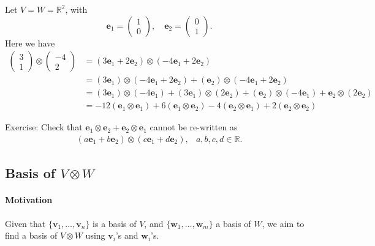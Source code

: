 \begin{example}
Let $V=W=\mathbb{R}^2$, with
\[
\bm e_1=\begin{pmatrix}
1\\0
\end{pmatrix},
\quad
\bm e_2=\begin{pmatrix}
0\\1
\end{pmatrix}.
\]
Here we have
\begin{align*}
\begin{pmatrix}
3\\1
\end{pmatrix}\otimes\begin{pmatrix}
-4\\2
\end{pmatrix}
&=(3\bm e_1+2\bm e_2)\otimes(-4\bm e_1+2\bm e_2)\\
&=(3\bm e_1)\otimes (-4\bm e_1+2\bm e_2)
+
(\bm e_2)\otimes(-4\bm e_1+2\bm e_2)\\
&=(3\bm e_1)\otimes(-4\bm e_1)
+
(3\bm e_1)\otimes(2\bm e_2)
+
(\bm e_2)\otimes(-4\bm e_1)
+
\bm e_2\otimes(2\bm e_2)\\
&=-12(\bm e_1\otimes\bm e_1)
+
6(\bm e_1\otimes\bm e_2)
-4
(\bm e_2\otimes\bm e_1)
+
2(\bm e_2\otimes\bm e_2)
\end{align*}
\end{example}

Exercise:
Check that $\bm e_1\otimes\bm e_2+\bm e_2\otimes\bm e_1$ cannot be re-written as 
\[
\begin{array}{ll}
(a\bm e_1+b\bm e_2)\otimes(c\bm e_1+d\bm e_2),
&
a,b,c,d\in\mathbb{R}.
\end{array}
\]

\subsection{Basis of $V\otimes W$}
\paragraph{Motivation}
Given that $\{\bm v_1,\dots,\bm v_n\}$ is a basis of $V$,
and 
$\{\bm w_1,\dots,\bm w_m\}$ a basis of $W$,
we aim to find a basis of $V\otimes W$ using $\bm v_i$'s and $\bm w_i$'s.


